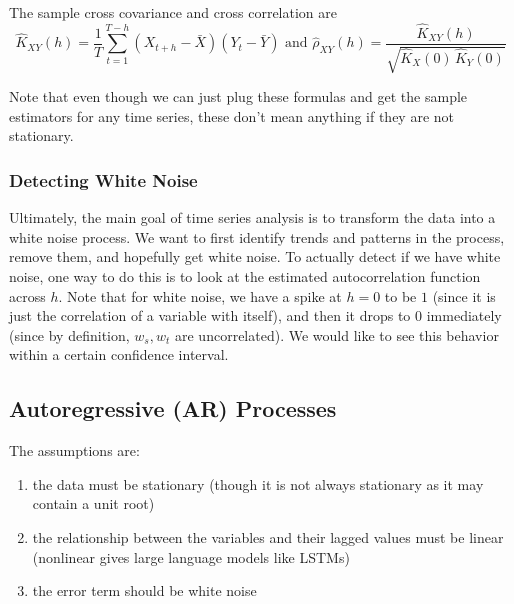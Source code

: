 \documentclass{article}
\begin{document}
      The sample cross covariance and cross correlation are 
      \begin{equation}
        \hat{K}_{XY} (h) = \frac{1}{T} \sum_{t=1}^{T-h} (X_{t+h} - \bar{X}) (Y_{t} - \bar{Y}) \text{ and } \hat{\rho}_{XY} (h) = \frac{\hat{K}_{XY}(h)}{\sqrt{\hat{K}_X (0) \, \hat{K}_Y (0)}}
      \end{equation}

      Note that even though we can just plug these formulas and get the sample estimators for any time series, these don't mean anything if they are not stationary. 

    \subsubsection{Detecting White Noise}

      Ultimately, the main goal of time series analysis is to transform the data into a white noise process. We want to first identify trends and patterns in the process, remove them, and hopefully get white noise. To actually detect if we have white noise, one way to do this is to look at the estimated autocorrelation function across $h$. Note that for white noise, we have a spike at $h = 0$ to be $1$ (since it is just the correlation of a variable with itself), and then it drops to $0$ immediately (since by definition, $w_s, w_t$ are uncorrelated). We would like to see this behavior within a certain confidence interval. 

  \subsection{Autoregressive (AR) Processes}

    The assumptions are: 
    \begin{enumerate}
      \item the data must be stationary (though it is not always stationary as it may contain a unit root)
      \item the relationship between the variables and their lagged values must be linear (nonlinear gives large language models like LSTMs)
      \item the error term should be white noise
    \end{enumerate}
\end{document}
